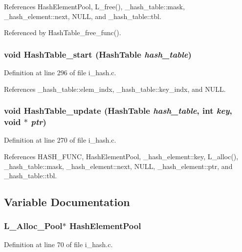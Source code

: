 References Hash\-Element\-Pool, L\_\-free(), \_\-hash\_\-table::mask, \_\-hash\_\-element::next, NULL, and \_\-hash\_\-table::tbl.

Referenced by Hash\-Table\_\-free\_\-func().
\subsubsection{\setlength{\rightskip}{0pt plus 5cm}void Hash\-Table\_\-start (\bf{Hash\-Table} {\em hash\_\-table})}\label{i__hash_8h_b5ceafd74e84938d3431eda4274d97f3}




Definition at line 296 of file i\_\-hash.c.

References \_\-hash\_\-table::elem\_\-indx, \_\-hash\_\-table::key\_\-indx, and NULL.
\subsubsection{\setlength{\rightskip}{0pt plus 5cm}void Hash\-Table\_\-update (\bf{Hash\-Table} {\em hash\_\-table}, int {\em key}, void $\ast$ {\em ptr})}\label{i__hash_8h_25f7582db136efb2599666381506437d}




Definition at line 270 of file i\_\-hash.c.

References HASH\_\-FUNC, Hash\-Element\-Pool, \_\-hash\_\-element::key, L\_\-alloc(), \_\-hash\_\-table::mask, \_\-hash\_\-element::next, NULL, \_\-hash\_\-element::ptr, and \_\-hash\_\-table::tbl.

\subsection{Variable Documentation}
\subsubsection{\setlength{\rightskip}{0pt plus 5cm}\bf{L\_\-Alloc\_\-Pool}$\ast$ \bf{Hash\-Element\-Pool}}\label{i__hash_8h_000917fef40551778dc8b425b32a1d1a}




Definition at line 70 of file i\_\-hash.c.

